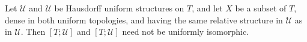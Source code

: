 Let $\mathcal{U}$ and $\mathcal{U}$ be Hausdorff uniform structures on $T$, and let $X$ be a subset of $T$, dense in both uniform topologies, and having the same relative structure in $\mathcal{U}$ as in $\mathcal{U}$. Then $[T; \mathcal{U}]$ and $[T; \mathcal{U}]$ need not be uniformly isomorphic.
